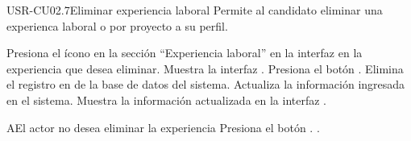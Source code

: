 \begin{UseCase}[]{USR-CU02.7}{Eliminar experiencia laboral}{
	Permite al candidato eliminar una experienca laboral o por proyecto a su perfil.
}
\end{UseCase}

\begin{UCtrayectoria}
	\UCpaso [\UCactor] Presiona el ícono \IUEliminar{} en la sección ``Experiencia laboral'' en la interfaz  en la experiencia que desea eliminar.
	\UCpaso Muestra la interfaz .
	\UCpaso [\UCsist] Presiona el botón .
	\UCpaso Elimina el registro en de la base de datos del sistema.
	\UCpaso Actualiza la información ingresada en el sistema.
	\UCpaso Muestra la información actualizada en la interfaz . 
\end{UCtrayectoria}

\begin{UCtrayectoriaA}{A}{El actor no desea eliminar la experiencia}
	\UCpaso [\UCsist] Presiona el botón .
	.
\end{UCtrayectoriaA} 
